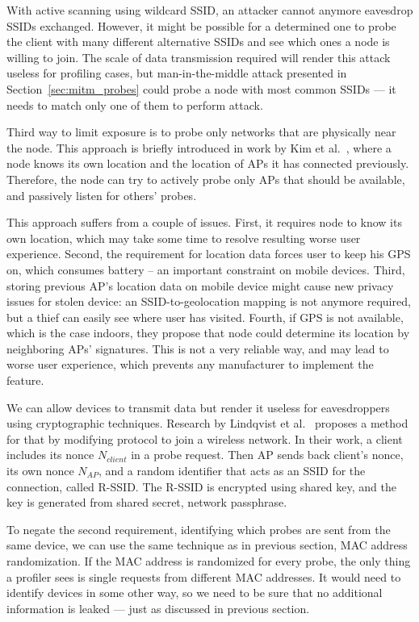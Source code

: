 \documentclass[12pt,a4paper,oneside,pdftex]{report}
\begin{document}
With active scanning using wildcard SSID, an attacker cannot anymore eavesdrop SSIDs exchanged. However, it might be possible for a determined one to probe the client with many different alternative SSIDs and see which ones a node is willing to join. The scale of data transmission required will render this attack useless for profiling cases, but man-in-the-middle attack presented in Section~\ref{sec:mitm_probes} could probe a node with most common SSIDs --- it needs to match only one of them to perform attack.

Third way to limit exposure is to probe only networks that are physically near the node. This approach is briefly introduced in work by Kim et al.~\cite{kimposter}, where a node knows its own location and the location of APs it has connected previously. Therefore, the node can try to actively probe only APs that should be available, and passively listen for others' probes. 

This approach suffers from a couple of issues. First, it requires node to know its own location, which may take some time to resolve resulting worse user experience. Second, the requirement for location data forces user to keep his GPS on, which consumes battery -- an important constraint on mobile devices. Third, storing previous AP's location data on mobile device might cause new privacy issues for stolen device: an SSID-to-geolocation mapping is not anymore required, but a thief can easily see where user has visited. Fourth, if GPS is not available, which is the case indoors, they propose that node could determine its location by neighboring APs' signatures. This is not a very reliable way, and may lead to worse user experience, which prevents any manufacturer to implement the feature.

We can allow devices to transmit data but render it useless for eavesdroppers using cryptographic techniques. Research by Lindqvist et al.~\cite{lindqvist2009privacy} proposes a method for that by modifying protocol to join a wireless network. In their work, a client includes its nonce $N_{client}$ in a probe request. Then AP sends back client's nonce, its own nonce $N_{AP}$, and a random identifier that acts as an SSID for the connection, called R-SSID. The R-SSID is encrypted using shared key, and the key is generated from shared secret, network passphrase.

To negate the second requirement, identifying which probes are sent from the same device, we can use the same technique as in previous section, MAC address randomization. If the MAC address is randomized for every probe, the only thing a profiler sees is single requests from different MAC addresses. It would need to identify devices in some other way, so we need to be sure that no additional information is leaked --- just as discussed in previous section.
\end{document}
